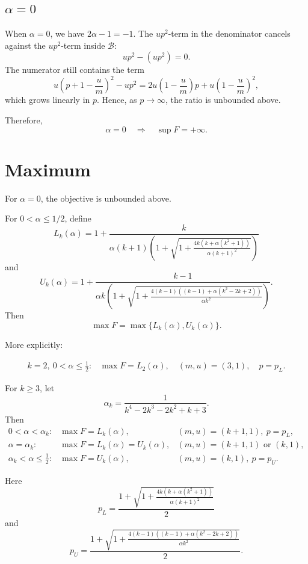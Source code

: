 \documentclass[11pt]{article}
\begin{document}
\subsection{\(\alpha=0\)}

When \(\alpha=0\), we have \(2\alpha-1=-1\). The \(up^2\)-term in the denominator cancels against the \(up^2\)-term inside \(\mathcal B\):
\[
        up^2-(up^2)=0.
\]
The numerator still contains the term
\[
        u\left(p+1-\frac um\right)^2-up^2
        =
        2u\left(1-\frac um\right)p
        +u\left(1-\frac um\right)^2,
\]
which grows linearly in \(p\). Hence, as \(p\to\infty\), the ratio is unbounded above.

Therefore,
\[
\boxed{
        \alpha=0
        \quad\Longrightarrow\quad
        \sup F=+\infty.
        }
\]

\section{Maximum}

For \(\alpha=0\), the objective is unbounded above.

For \(0<\alpha\leq 1/2\), define
\[
\boxed{
L_k(\alpha)
=
1+
\frac{k}{
\alpha(k+1)\left(
1+\sqrt{
1+\frac{4k\left(k+\alpha(k^2+1)\right)}{\alpha(k+1)^2}
}
\right)}
}
\]
and
\[
\boxed{
U_k(\alpha)
=
1+
\frac{k-1}{
\alpha k\left(
1+\sqrt{
1+
\frac{
4(k-1)\left((k-1)+\alpha(k^2-2k+2)\right)
}{\alpha k^2}
}
\right)}
}.
\]
Then
\[
\boxed{
        \max F=\max\{L_k(\alpha),U_k(\alpha)\}.
        }
\]

More explicitly:

\[
\boxed{
\begin{array}{ll}
k=2,\ 0<\alpha\leq \frac12:
&
\max F=L_2(\alpha),
\quad (m,u)=(3,1),
\quad p=p_L.
\end{array}
}
\]

For \(k\geq 3\), let
\[
        \alpha_k=
        \frac{1}{k^4-2k^3-2k^2+k+3}.
\]
Then
\[
\boxed{
\begin{array}{lll}
0<\alpha<\alpha_k:
&
\max F=L_k(\alpha),
&
(m,u)=(k+1,1),\ p=p_L,
\\[6pt]
\alpha=\alpha_k:
&
\max F=L_k(\alpha)=U_k(\alpha),
&
(m,u)=(k+1,1)\text{ or }(k,1),
\\[6pt]
\alpha_k<\alpha\leq \frac12:
&
\max F=U_k(\alpha),
&
(m,u)=(k,1),\ p=p_U.
\end{array}
}
\]

Here
\[
\boxed{
p_L
=
\frac{
1+\sqrt{
1+\frac{4k\left(k+\alpha(k^2+1)\right)}{\alpha(k+1)^2}
}
}{2}
}
\]
and
\[
\boxed{
p_U
=
\frac{
1+\sqrt{
1+
\frac{
4(k-1)\left((k-1)+\alpha(k^2-2k+2)\right)
}{\alpha k^2}
}
}{2}
}.
\]
\end{document}
